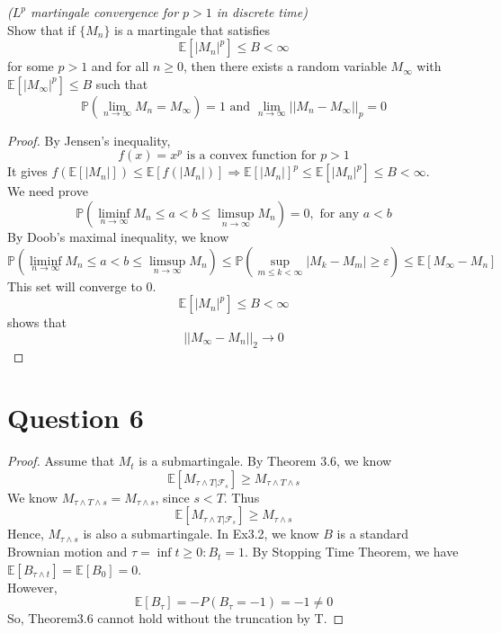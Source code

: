 \documentclass{article}
\begin{document}
    \textit{($L^p$ martingale convergence for $p>1$ in discrete time)}\\
    Show that if $\{M_n\}$ is a martingale that satisfies
    $$\mathbb{E}\left[\left|M_n\right|^p\right] \leqslant B < \infty$$
    for some $p>1$ and for all $n\geqslant 0$, then there exists a random variable $M_\infty$ with $\mathbb{E}\left[\left| M_\infty\right|^p\right]\leqslant B$ such that
    $$\mathbb{P}\left(\lim_{n\to \infty}M_n = M_\infty\right)=1 \text{ and } \lim_{n\to \infty}||M_n-M_\infty||_p=0$$
    \begin{proof}
    By Jensen's inequality,
    $$f(x)=x^p \text{ is a convex function for } p>1$$
    It gives $f(\mathbb{E}[|M_n|])\leqslant \mathbb{E}[f(|M_n|)] \Rightarrow \mathbb{E}[|M_n|]^p \leqslant \mathbb{E}[|M_n|^p]\leqslant B <\infty$.\\
    We need prove
    $$\mathbb{P}\left(\liminf_{n\to\infty}{M_n}\leqslant a <b\leqslant \limsup_{n\to\infty}{M_n}\right)=0, \text{ for any } a<b$$
    By Doob's maximal inequality, we know
    $$\mathbb{P}\left(\liminf_{n\to\infty}{M_n}\leqslant a <b\leqslant \limsup_{n\to\infty}{M_n}\right) \leqslant \mathbb{P}\left(\sup_{m\leqslant k <\infty}|M_k-M_m|\geqslant \varepsilon\right) \leqslant \mathbb{E}[M_\infty-M_n]$$
    This set will converge to 0.\\
    $$\mathbb{E}[|M_n|^p]\leqslant B <\infty$$ shows that $$||M_\infty-M_n||_2\to 0$$
    \end{proof}

\section*{Question 6}
    \begin{proof}
    Assume that $M_t$ is a submartingale.
    By Theorem 3.6, we know
    $$\mathbb{E}[M_{\tau \wedge T|\mathcal{F}_s}]\geqslant M_{\tau\wedge T \wedge s}$$
    We know $M_{\tau\wedge T \wedge s}=M_{\tau \wedge s}$, since $s<T$. Thus
    $$\mathbb{E}[M_{\tau \wedge T|\mathcal{F}_s}]\geqslant M_{\tau \wedge s}$$
    Hence, $M_{\tau \wedge s}$ is also a submartingale. In Ex3.2, we know $B$ is a standard Brownian motion and $\tau=\inf{t\geqslant 0: B_t=1}$. By Stopping Time Theorem, we have $\mathbb{E}[B_{\tau\wedge t}]=\mathbb{E}[B_0]=0$.\\
    However,
    $$\mathbb{E}[B_\tau]=-P(B_\tau=-1)=-1 \not=0$$
    So, Theorem3.6 cannot hold without the truncation by T.
    \end{proof}
\end{document}

